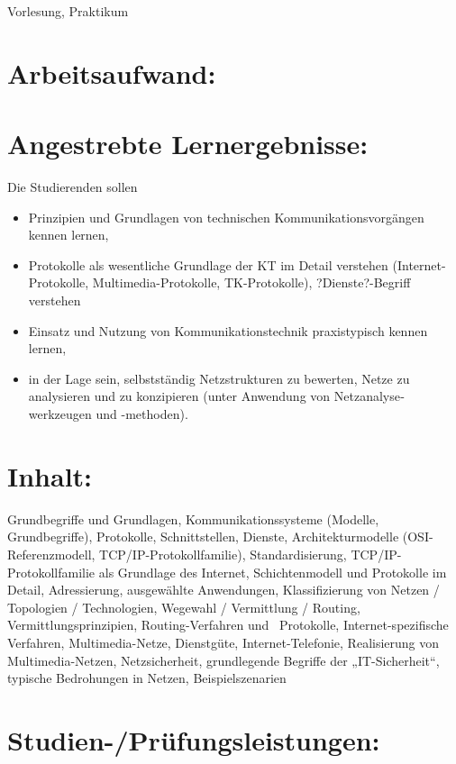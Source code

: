 Vorlesung, Praktikum

\section{Arbeitsaufwand:}\label{arbeitsaufwand-12}

\section{Angestrebte
Lernergebnisse:}\label{angestrebte-lernergebnisse-12}

Die Studierenden sollen

\begin{itemize}
\item
  Prinzipien und Grundlagen von technischen Kommunikations­vor­gängen
  kennen lernen,
\item
  Protokolle als wesentliche Grundlage der KT im Detail verstehen
  (Internet-Protokolle, Multimedia-Protokolle, TK-Protokolle),
  ?Dienste?-Begriff verstehen
\item
  Einsatz und Nutzung von Kommunikations­tech­nik praxistypisch kennen
  lernen,
\item
  in der Lage sein, selbstständig Netzstrukturen zu bewerten, Netze zu
  analysieren und zu konzipieren (unter Anwendung von
  Netz­analyse­werkzeugen und -methoden).
\end{itemize}

\section{Inhalt:}\label{inhalt-12}

Grundbegriffe und Grundlagen, Kommunikationssysteme (Modelle,
Grundbegriffe), Protokolle, Schnittstellen, Dienste, Architekturmodelle
(OSI-Referenzmodell, TCP/IP-Protokollfamilie), Standardisierung,
TCP/IP-Protokollfamilie als Grundlage des Internet, Schichtenmodell und
Protokolle im Detail, Adressierung, ausgewählte Anwendungen,
Klassifizierung von Netzen / Topologien / Technologien, Wegewahl /
Vermittlung / Routing, Vermittlungsprinzipien, Routing-Verfahren und~
Protokolle, Internet-spezifische Verfahren, Multimedia-Netze,
Dienstgüte, Internet-Telefonie, Realisierung von Multimedia-Netzen,
Netzsicherheit, grundlegende Begriffe der „IT-Sicherheit``, typische
Bedrohungen in Netzen, Beispielszenarien

\section{Studien-/Prüfungsleistungen:}\label{studien-pruxfcfungsleistungen-12}

